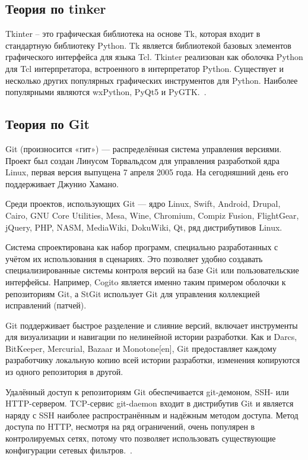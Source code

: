 \documentclass[a4paper,14pt]{extarticle}
\begin{document}
\subsection{Теория по tinker}
Tkinter – это графическая библиотека на основе Tk, которая входит в стандартную библиотеку Python. Tk является библиотекой базовых элементов графического интерфейса для языка Tcl. Tkinter реализован как оболочка Python для Tcl интерпретатора, встроенного в интерпретатор Python. Существует и несколько других популярных графических инструментов для Python. Наиболее популярными являются wxPython, PyQt5 и PyGTK.~\cite{tinker}.

\subsection{Теория по Git}

Git (произносится «гит») — распределённая система управления версиями. Проект был создан Линусом Торвальдсом для управления разработкой ядра Linux, первая версия выпущена 7 апреля 2005 года. На сегодняшний день его поддерживает Джунио Хамано.

Среди проектов, использующих Git — ядро Linux, Swift, Android, Drupal, Cairo, GNU Core Utilities, Mesa, Wine, Chromium, Compiz Fusion, FlightGear, jQuery, PHP, NASM, MediaWiki, DokuWiki, Qt, ряд дистрибутивов Linux.

Система спроектирована как набор программ, специально разработанных с учётом их использования в сценариях. Это позволяет удобно создавать специализированные системы контроля версий на базе Git или пользовательские интерфейсы. Например, Cogito является именно таким примером оболочки к репозиториям Git, а StGit использует Git для управления коллекцией исправлений (патчей).

Git поддерживает быстрое разделение и слияние версий, включает инструменты для визуализации и навигации по нелинейной истории разработки. Как и Darcs, BitKeeper, Mercurial, Bazaar и Monotone[en], Git предоставляет каждому разработчику локальную копию всей истории разработки, изменения копируются из одного репозитория в другой.

Удалённый доступ к репозиториям Git обеспечивается git-демоном, SSH- или HTTP-сервером. TCP-сервис git-daemon входит в дистрибутив Git и является наряду с SSH наиболее распространённым и надёжным методом доступа. Метод доступа по HTTP, несмотря на ряд ограничений, очень популярен в контролируемых сетях, потому что позволяет использовать существующие конфигурации сетевых фильтров.~\cite{gitik}.
\end{document}
